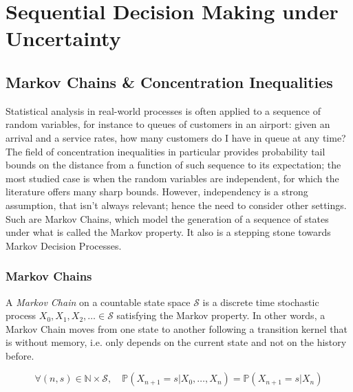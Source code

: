 
\chapter{Sequential Decision Making under Uncertainty}

\label{chapter2}




\section{Markov Chains \& Concentration Inequalities}

Statistical analysis in real-world processes is often applied to a sequence of random variables, for instance to queues of customers in an airport: given an arrival and a service rates, how many customers do I have in queue at any time? The field of concentration inequalities in particular provides probability tail bounds on the distance from a function of such sequence to its expectation; the most studied case is when the random variables are independent, for which the literature offers many sharp bounds. However, independency is a strong assumption, that isn't always relevant; hence the need to consider other settings. Such are Markov Chains, which model the generation of a sequence of states under what is called the Markov property. It also is a stepping stone towards Markov Decision Processes.

\subsection{Markov Chains}
\label{subsec:MC}

A \emph{Markov Chain} on a countable state space $\mathcal{S}$ is a discrete time stochastic process $X_0, X_1, X_2, \dots \in \mathcal{S}$ satisfying the Markov property. In other words, a Markov Chain moves from one state to another following a transition kernel that is without memory, i.e. only depends on the current state and not on the history before.

\begin{defi}
  $$\forall (n, s) \in \mathbb{N} \times \mathcal{S},\quad \mathbb{P}(X_{n+1} = s | X_0, \dots, X_n) = \mathbb{P}(X_{n+1} = s | X_n)$$
\end{defi}

